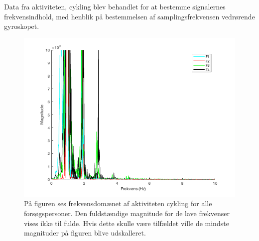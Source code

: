 Data fra aktiviteten, cykling blev behandlet for at bestemme signalernes frekvensindhold, med henblik på bestemmelsen af samplingsfrekvensen vedrørende gyroskopet.
\begin{figure}[H]
	\centering
	\includegraphics[scale=0.40]{figures/qBilag/cykling_frekvens}
	\caption{På figuren ses frekvensdomænet af aktiviteten cykling for alle forsøgspersoner. Den fuldstændige magnitude for de lave frekvenser vises ikke til fulde. Hvis dette skulle være tilfældet ville de mindste magnituder på figuren blive udskalleret.}
	\label{fig:Ap_cyklingfrekvens}
\end{figure}\vspace{-.25cm}

